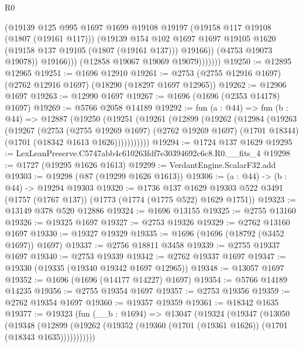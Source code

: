 \begin{lexlean}{R0}
\begin{coremodule}
                        (@19139
                          @125
                          @995
                          @1697
                          @1699
                          @19108
                          @19197
                          (@19158 @117 @19108 (@1807 (@19161 @117)))
                          (@19139
                            @154
                            @102
                            @1697
                            @1697
                            @19105
                            @1620
                            (@19158 @137 @19105 (@1807 (@19161 @137)))
                            @19166))
                        (@4753 @19073 @19078))
                      @19166)))
                (@12858 @19067 @19069 @19079)))))))
@19250 := @12895 @12965
@19251 := @1696 @12910
@19261 := @2753 (@2755 @12916 @1697) (@2762 @12916 @1697) (@18290 (@18297 @1697 @12965))
@19262 := @12906 @1697
@19263 := @12990 @1697
@19267 := @1696 (@1696 (@2353 @14178) @1697)
@19269 := @5766 @2058 @14189
@19292 := fun (a : @44) =>
  fun (b : @44) =>
  @12887
    (@19250
      (@19251
        (@19261
          (@12899
            (@19262
              (@12984
                (@19263
                  (@19267
                    (@2753
                      (@2755 @19269 @1697)
                      (@2762 @19269 @1697)
                      (@1701 @18344)
                      (@1701 (@18342 @1613 @1626)))))))))))
@19294 := @1724 @137 @1629
@19295 := LexLeanPreserve.C5747abb4c610263fdf7e30394692c6c8.R0.__fits_4
@19298 := @1727 (@19295 @1626 @1613)
@19299 := VerdantEngine.ScalarF32.add
@19303 := @19298 (@87 (@19299 @1626 @1613))
@19306 := (a : @44) -> (b : @44) -> @19294 @19303
@19320 := @1736
    @137
    @1629
    @19303
    @522
    @3491
    (@1757 (@1767 @137))
    (@1773 (@1774 (@1775 @522) @1629 @1751))
@19323 := @13149 @378 @520 @12886
@19324 := @1696 @13155
@19325 := @2755 @13160
@19326 := @19325 @1697
@19327 := @2753 @19326
@19329 := @2762 @13160 @1697
@19330 := @19327 @19329
@19335 := @1696 (@1696 (@18792 (@3452 @1697)) @1697)
@19337 := @2756 @18811 @3458
@19339 := @2755 @19337 @1697
@19340 := @2753 @19339
@19342 := @2762 @19337 @1697
@19347 := @19330 (@19335 (@19340 @19342 @1697 @12965))
@19348 := @13057 @1697
@19352 := @1696 (@1696 (@14177 @14227) @1697)
@19354 := @5766 @14189 @14235
@19356 := @2755 @19354 @1697
@19357 := @2753 @19356
@19359 := @2762 @19354 @1697
@19360 := @19357 @19359
@19361 := @18342 @1635
@19377 := @19323
    (fun (__b : @1694) =>
    @13047
      (@19324
        (@19347
          (@13050
            (@19348
              (@12899 (@19262 (@19352 (@19360 (@1701 (@19361 @1626)) (@1701 (@18343 @1635)))))))))))

\end{coremodule}
\end{lexlean}

